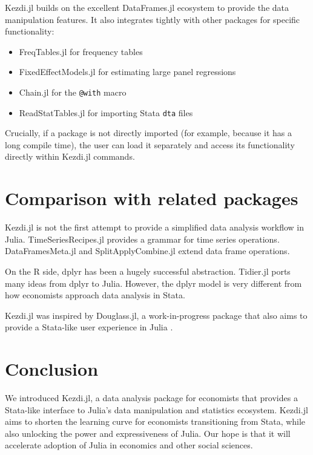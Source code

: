\documentclass{juliacon}
\begin{document}
Kezdi.jl builds on the excellent DataFrames.jl ecosystem \citep{DataFrame.jl2023} to provide the data manipulation features. It also integrates tightly with other packages for specific functionality:

\begin{itemize}
    \item FreqTables.jl \citep{FreqTables.jl2023} for frequency tables
    \item FixedEffectModels.jl \citep{FixedEffectModels.jl2023} for estimating large panel regressions
    \item Chain.jl for the \texttt{@with} macro
    \item ReadStatTables.jl for importing Stata \texttt{dta} files
\end{itemize}

Crucially, if a package is not directly imported (for example, because it has a long compile time), the user can load it separately and access its functionality directly within Kezdi.jl commands.

\section{Comparison with related packages}

Kezdi.jl is not the first attempt to provide a simplified data analysis workflow in Julia. TimeSeriesRecipes.jl \citep{TimeSeriesRecipes2022} provides a grammar for time series operations. DataFramesMeta.jl \citep{DataFramesMeta2023} and SplitApplyCombine.jl \citep{SplitApplyCombine2023} extend data frame operations. 

On the R side, dplyr \citep{dplyr2023} has been a hugely successful abstraction. Tidier.jl \citep{tidier2022} ports many ideas from dplyr to Julia. However, the dplyr model is very different from how economists approach data analysis in Stata.

Kezdi.jl was inspired by Douglass.jl, a work-in-progress package that also aims to provide a Stata-like user experience in Julia \citep{Douglass.jl2023}.

\section{Conclusion}

We introduced Kezdi.jl, a data analysis package for economists that provides a Stata-like interface to Julia's data manipulation and statistics ecosystem. Kezdi.jl aims to shorten the learning curve for economists transitioning from Stata, while also unlocking the power and expressiveness of Julia. Our hope is that it will accelerate adoption of Julia in economics and other social sciences.
\end{document}
